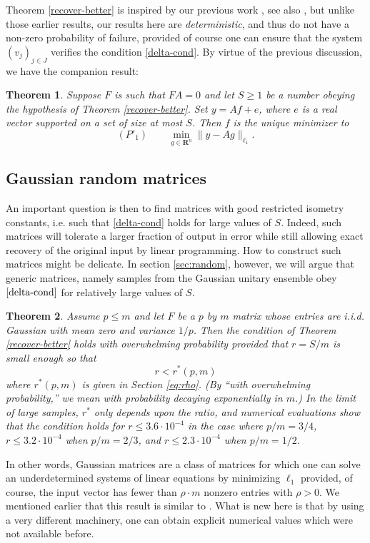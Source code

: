 \documentclass[11pt]{article}
\def\R{{{\mathbf{R}}}} %
\def\emph#1{{\it #1}} \def\textbf#1{{\bf #1}}
\newcommand{\<}{\langle}
\renewcommand{\>}{\rangle}
\newtheorem{theorem}{Theorem}[section]
\numberwithin{equation}{section}
\begin{document}
Theorem \ref{recover-better} is inspired by our previous work
\cite{OptimalRecovery}, see also \cite{CRT,RandomBP}, but unlike those
earlier results, our results here are \emph{deterministic}, and thus
do not have a non-zero probability of failure, provided of course one
can ensure that the system $(v_j)_{j \in J}$ verifies the condition
\eqref{delta-cond}. By virtue of the previous discussion, we have the
companion result:
\begin{theorem}
\label{teo:decode} 
Suppose $F$ is such that $F A = 0$ and let $S \geq 1$ be a number
obeying the hypothesis of Theorem \ref{recover-better}. Set $y = A f +
e$, where $e$ is a real vector supported on a set of size at most $S$.
Then $f$ is the unique minimizer to
\[
(P'_1) \quad \quad \min_{g \in \R^n} \|y - A g\|_{\ell_1}.  
\]
\end{theorem}


\subsection{Gaussian random matrices}

An important question is then to find matrices with good restricted
isometry constants, i.e. such that \eqref{delta-cond} holds for large
values of $S$. Indeed, such matrices will tolerate a larger fraction
of output in error while still allowing exact recovery of the original
input by linear programming. How to construct such matrices might be
delicate. In section \ref{sec:random}, however, we will argue that
generic matrices, namely samples from the Gaussian unitary ensemble
obey $\eqref{delta-cond}$ for relatively large values of $S$.
\begin{theorem} 
\label{teo:gauss}
Assume $p \le m$ and let $F$ be a $p$ by $m$ matrix whose entries are
i.i.d. Gaussian with mean zero and variance $1/p$. Then the condition
of Theorem \ref{recover-better} holds with overwhelming probability
provided that $r = S/m$ is small enough so that
\[
r < r^*(p,m)
\]
where $r^*(p,m)$ is given in Section \ref{eq:rho}. (By ``with
overwhelming probability,'' we mean with probability decaying
exponentially in $m$.)  In the limit of large samples, $r^*$ only
depends upon the ratio, and numerical evaluations show that the
condition holds for $r \le 3.6 \cdot 10^{-4}$ in the case where $p/m =
3/4$, $r \le 3.2 \cdot 10^{-4}$ when $p/m = 2/3$, and $r \le 2.3 \cdot
10^{-4}$ when $p/m = 1/2$.
\end{theorem}
In other words, Gaussian matrices are a class of matrices for which
one can solve an underdetermined systems of linear equations by
minimizing $\ell_1$ provided, of course, the input vector has fewer
than $\rho \cdot m$ nonzero entries with $\rho > 0$. We mentioned
earlier that this result is similar to \cite{Equivl0l1} . What is new
here is that by using a very different machinery, one can obtain
explicit numerical values which were not available before.
\end{document}
